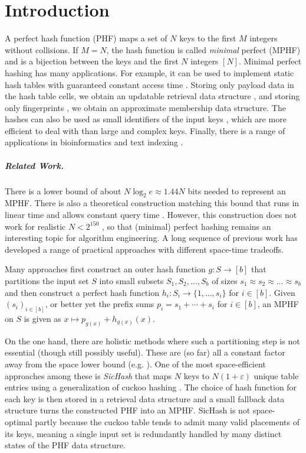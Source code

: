 \documentclass[a4paper,USenglish,cleveref]{lipics-v2021}
\newcommand{\myparagraph}[1]{\subparagraph*{#1}}
\begin{document}
\newpage

\section{Introduction}
A perfect hash function (PHF) maps a set of $N$ keys to the first $M$ integers without collisions.
If $M=N$, the hash function is called \emph{minimal} perfect (MPHF) and is a bijection between the keys and the first $N$ integers $[N]$.
Minimal perfect hashing has many applications.
For example, it can be used to implement static hash tables with guaranteed constant access time \cite{fredman1984storing}.
Storing only payload data in the hash table cells, we obtain an updatable retrieval data structure \cite{MSSZ14}, and storing only fingerprints \cite{fan2014cuckoo,bender2018bloom}, we obtain an approximate membership data structure.
The hashes can also be used as small identifiers of the input keys \cite{botelho2007perfect}, which are more efficient to deal with than large and complex keys.
Finally, there is a range of applications in bioinformatics \cite{chapman2011meraculous,chen2013hybrid,chikhi2016compacting,almodaresi2018space} and text indexing \cite{belazzougui2014alphabet,belazzougui2010fast,Witten:1999}.

\myparagraph{Related Work.}
There is a lower bound of about $N\log_2 e\approx 1.44N$ bits needed to represent an MPHF.
There is also a theoretical construction matching this bound that runs in linear time and allows constant query time \cite{HagTho01}.
However, this construction does not work for realistic $N<2^{150}$ \cite{botelho2013practical}, so that (minimal) perfect hashing remains an interesting topic for algorithm engineering.
A long sequence of previous work has developed a range of practical approaches with different space-time tradeoffs.

Many approaches first construct an outer hash function $g : S \rightarrow [b]$ that partitions the input set $S$ into small subsets $S_1, S_2, \ldots, S_b$ of sizes $s_1 \approx s_2 \approx \ldots \approx s_b$ and then construct a perfect hash function $h_i : S_i \rightarrow \{1,\ldots, s_i\}$ for $i \in [b]$.
Given $(s_i)_{i \in [b]}$, or better yet the prefix sums $p_i = s_1 + \cdots + s_{i}$ for $i \in [b]$, an MPHF on $S$ is given as $x \mapsto p_{g(x)} + h_{g(x)}(x)$.

On the one hand, there are holistic methods where such a partitioning step is not essential (though still possibly useful).
These are (so far) all a constant factor away from the space lower bound (e.g. \cite{chapman2011meraculous,MSSZ14,lehmann2023sichash,beling2023fingerprinting}).
One of the most space-efficient approaches among these is \emph{SicHash} \cite{lehmann2023sichash} that maps $N$ keys to $N(1+\varepsilon)$ unique table entries using a generalization of cuckoo hashing \cite{pagh2004cuckoo,fotakis2005space}.
The choice of hash function for each key is then stored in a retrieval data structure and a small fallback data structure turns the constructed PHF into an MPHF.
SicHash is not space-optimal partly because the cuckoo table tends to admit many valid placements of its keys, meaning a single input set is redundantly handled by many distinct states of the PHF data structure.
\end{document}
